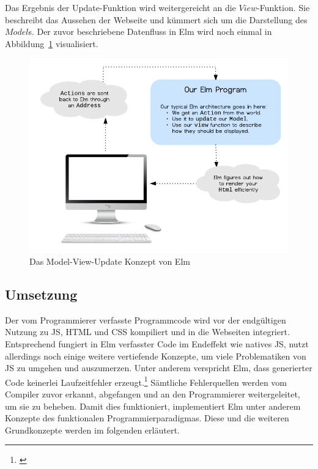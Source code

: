 Das Ergebnis der Update-Funktion wird weitergereicht an die $View$-Funktion. Sie beschreibt das Aussehen der Webseite und kümmert sich um die Darstellung des $Model$s.
Der zuvor beschriebene Datenfluss in Elm wird noch einmal in Abbildung~\ref{fig:elm-model-view-update-concept} visualisiert.
\begin{figure}[h]
  \centering  
  \includegraphics[scale=1]{img/elm-model-view-update-concept.png}
  \caption{Das Model-View-Update Konzept von Elm}\label{fig:elm-model-view-update-concept}
\end{figure}

\subsection{Umsetzung}
\label{sec:Umsetzung}
Der vom Programmierer verfasste Programmcode wird vor der endgültigen Nutzung zu \ac{JS}, \ac{HTML} und \ac{CSS} kompiliert und in die Webseiten integriert. Entsprechend fungiert in Elm verfasster Code im Endeffekt wie natives \ac{JS}, nutzt allerdings noch einige weitere vertiefende Konzepte, um viele Problematiken von \ac{JS} zu umgehen und auszumerzen.
Unter anderem verspricht Elm, dass generierter Code keinerlei Laufzeitfehler erzeugt.\footnote{\cite[Vgl.]{elm-no-runtime-errors}} Sämtliche Fehlerquellen werden vom Compiler zuvor erkannt, abgefangen und an den Programmierer weitergeleitet, um sie zu beheben. Damit dies funktioniert, implementiert Elm unter anderem Konzepte des funktionalen Programmierparadigmas. Diese und die weiteren Grundkonzepte werden im folgenden erläutert.

